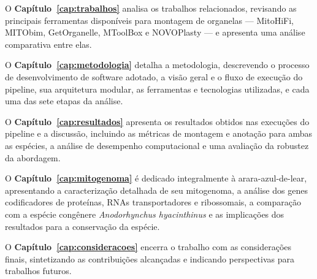 O \textbf{Capítulo~\ref{cap:trabalhos}} analisa os trabalhos relacionados, revisando as principais ferramentas disponíveis para montagem de organelas --- MitoHiFi, MITObim, GetOrganelle, MToolBox e NOVOPlasty --- e apresenta uma análise comparativa entre elas.

O \textbf{Capítulo~\ref{cap:metodologia}} detalha a metodologia, descrevendo o processo de desenvolvimento de software adotado, a visão geral e o fluxo de execução do pipeline, sua arquitetura modular, as ferramentas e tecnologias utilizadas, e cada uma das sete etapas da análise.

O \textbf{Capítulo~\ref{cap:resultados}} apresenta os resultados obtidos nas execuções do pipeline e a discussão, incluindo as métricas de montagem e anotação para ambas as espécies, a análise de desempenho computacional e uma avaliação da robustez da abordagem.

O \textbf{Capítulo~\ref{cap:mitogenoma}} é dedicado integralmente à arara-azul-de-lear, apresentando a caracterização detalhada de seu mitogenoma, a análise dos genes codificadores de proteínas, RNAs transportadores e ribossomais, a comparação com a espécie congênere \textit{Anodorhynchus hyacinthinus} e as implicações dos resultados para a conservação da espécie.

O \textbf{Capítulo~\ref{cap:consideracoes}} encerra o trabalho com as considerações finais, sintetizando as contribuições alcançadas e indicando perspectivas para trabalhos futuros.
